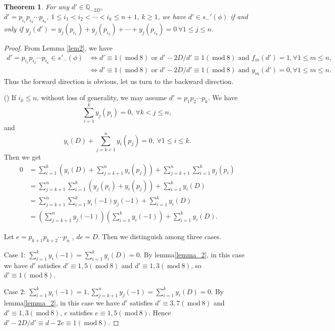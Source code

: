 \documentclass{amsart}
\numberwithin{equation}{section}
\theoremstyle{plain}
\newtheorem{thm_}[equation]{Theorem}
\theoremstyle{definition}
\newcommand{\thm}[1]{\begin{thm_}#1\end{thm_}}
\newcommand{\pf}[1]{\begin{proof}#1\end{proof}}
\newcommand{\QQ}{\mathbb Q}
\renewcommand{\mod}[1]{\ \mathrm{mod}\ #1}  %
\begin{document}
\thm{\label{thm2}For any $d' \in \QQ_{-2D}$, $d' = p_{i_1}p_{i_2}\cdots p_{i_k} , \ 1\le i_1 < i_2 < \cdots < i_k \le n+1, \ k \ge 1$, we have $d' \in s_-'(\phi)$ if and only if $y_{j}(d') =  y_{j}(p_{i_1}) + y_{j}(p_{i_2}) + \cdots + y_{j}(p_{i_k}) = 0 \ \forall 1\le j \le n$.}

\pf{
	From Lemma \ref{lem2}, we have
$$
\begin{aligned}
d' = p_{i_1}p_{i_2} \cdots p_{i_k}  \in s'_-(\phi) & \Leftrightarrow d' \equiv 1 (\mod 8) \text{ or } d' - 2D/d' \equiv 1 (\mod 8)\text{ and }  f_{m}(d') = 1, \forall 1\leq m \leq n, \\
& \Leftrightarrow d' \equiv 1 (\mod 8) \text{ or } d' - 2D/d' \equiv 1 (\mod 8)\text{ and } y_{m}(d') = 0, \forall 1\leq m \leq n .
\end{aligned}
$$
Thus the forward direction is obvious, let us turn to the backward direction.

(\romannumeral1) If $i_k \le n$, without loss of generality, we may assume $d' = p_{1}p_{2}\cdots p_{k}$. We have
	$$ \sum\limits_{i = 1}^{k} y_{j}(p_i) = 0,\ \forall  k < j \le n,$$
	and
	$$  y_{i}(D) +\sum\limits_{j = k+1}^{n} y_{i}(p_j) = 0, \   \forall 1 \le i \le k. $$
	Then we get
	$$
	\begin{aligned}
	0 &= \sum\limits_{i = 1}^{k} (y_{i}(D) +\sum\limits_{j = k+1}^{n} y_{i}(p_j) ) + \sum\limits_{j = k+1}^{n}\sum\limits_{i = 1}^{k}y_{j}(p_i)  \\
	 &= \sum\limits_{j = k+1}^{n}\sum\limits_{i = 1}^{k}(y_{j}(p_i) + y_{i}(p_j)) + \sum\limits_{i = 1}^{k} y_{i}(D)\\
	 &= \sum\limits_{j = k+1}^{n}\sum\limits_{i = 1}^{k} y_{i}(-1)y_{j}(-1) + \sum\limits_{i = 1}^{k} y_{i}(D)\\
	 &= (\sum\limits_{j = k+1}^{n} y_{j}(-1))(\sum\limits_{i = 1}^{k}y_{i}(-1)) + \sum\limits_{i = 1}^{k} y_{i}(D).
	\end{aligned}
	$$

	 Let $e = p_{k+1}p_{k+2}\cdots p_{n}$ , $de = D$. Then we distinguish among three cases.

	Case 1: $\sum\limits_{i = 1}^{k}y_{i}(-1) = \sum\limits_{i = 1}^{k} y_{i}(D) = 0 $. By lemma\ref{lemma_2}, in this case we have $d'$ satisfies $d' \equiv 1,5 (\mod 8)$ and $d' \equiv 1,3 (\mod 8)$, so $d' \equiv 1 (\mod 8) $.

	Case 2: $\sum\limits_{i = 1}^{k}y_{i}(-1) = 1, \sum\limits_{j = k+1}^{n} y_{j}(-1)  = \sum\limits_{i = 1}^{k} y_{i}(D) = 0 $. By lemma\ref{lemma_2}, in this case we have $d'$ satisfies $d' \equiv 3,7 (\mod 8)$ and $d' \equiv 1,3 (\mod 8)$, $e$ satisfies  $e \equiv 1,5 (\mod 8)$. Hence $d' - 2D/d' \equiv d - 2e \equiv 1 (\mod 8)$.

}
\end{document}
